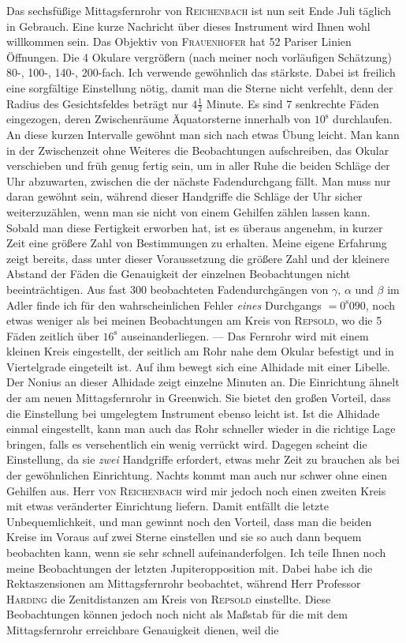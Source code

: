 \par\indent Das sechsfüßige Mittagsfernrohr von \textsc{Reichenbach} ist nun seit Ende Juli täglich in Gebrauch. Eine kurze Nachricht über dieses Instrument wird Ihnen wohl willkommen sein. Das Objektiv von \textsc{Frauenhofer} hat 52 Pariser Linien Öffnungen. Die 4 Okulare vergrößern (nach meiner noch vorläufigen Schätzung) 80-, 100-, 140-, 200-fach. Ich verwende gewöhnlich das stärkste. Dabei ist freilich eine sorgfältige Einstellung nötig, damit man die Sterne nicht verfehlt, denn der Radius des Gesichtsfeldes beträgt nur $4\tfrac{1}{2}$ Minute. Es sind 7 senkrechte Fäden eingezogen, deren Zwischenräume Äquatorsterne innerhalb von $10^{\mathrm s}$ durchlaufen. An diese kurzen Intervalle gewöhnt man sich nach etwas Übung leicht. Man kann in der Zwischenzeit ohne Weiteres die Beobachtungen aufschreiben, das Okular verschieben und früh genug fertig sein, um in aller Ruhe die beiden Schläge der Uhr abzuwarten, zwischen die der nächste Fadendurchgang fällt. Man muss nur daran gewöhnt sein, während dieser Handgriffe die Schläge der Uhr sicher weiterzuzählen, wenn man sie nicht von einem Gehilfen zählen lassen kann. Sobald man diese Fertigkeit erworben hat, ist es überaus angenehm, in kurzer Zeit eine größere Zahl von Bestimmungen zu erhalten. Meine eigene Erfahrung zeigt bereits, dass unter dieser Voraussetzung die größere Zahl und der kleinere Abstand der Fäden die Genauigkeit der einzelnen Beobachtungen nicht beeinträchtigen. Aus fast 300 beobachteten Fadendurchgängen von $\gamma$, $\alpha$ und $\beta$ im Adler finde ich für den wahrscheinlichen Fehler \emph{eines} Durchgangs $= 0^{\mathrm{s}}090$, noch etwas weniger als bei meinen Beobachtungen am Kreis von \textsc{Repsold}, wo die 5 Fäden zeitlich über $16^{\mathrm{s}}$ auseinanderliegen. — Das Fernrohr wird mit einem kleinen Kreis eingestellt, der seitlich am Rohr nahe dem Okular befestigt und in Viertelgrade eingeteilt ist. Auf ihm bewegt sich eine Alhidade mit einer Libelle. Der Nonius an dieser Alhidade zeigt einzelne Minuten an. Die Einrichtung ähnelt der am neuen Mittagsfernrohr in Greenwich. Sie bietet den großen Vorteil, dass die Einstellung bei umgelegtem Instrument ebenso leicht ist. Ist die Alhidade einmal eingestellt, kann man auch das Rohr schneller wieder in die richtige Lage bringen, falls es versehentlich ein wenig verrückt wird. Dagegen scheint die Einstellung, da sie \emph{zwei} Handgriffe erfordert, etwas mehr Zeit zu brauchen als bei der gewöhnlichen Einrichtung. Nachts kommt man auch nur schwer ohne einen Gehilfen aus. Herr \textsc{von Reichenbach} wird mir jedoch noch einen zweiten Kreis mit etwas veränderter Einrichtung liefern. Damit entfällt die letzte Unbequemlichkeit, und man gewinnt noch den Vorteil, dass man die beiden Kreise im Voraus auf zwei Sterne einstellen und sie so auch dann bequem beobachten kann, wenn sie sehr schnell aufeinanderfolgen. Ich teile Ihnen noch meine Beobachtungen der letzten Jupiteropposition mit. Dabei habe ich die Rektaszensionen am Mittagsfernrohr beobachtet, während Herr Professor \textsc{Harding} die Zenitdistanzen am Kreis von \textsc{Repsold} einstellte. Diese Beobachtungen können jedoch noch nicht als Maßstab für die mit dem Mittagsfernrohr erreichbare Genauigkeit dienen, weil die 